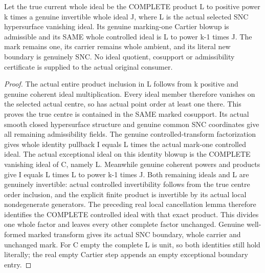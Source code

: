 \begin{lemma}
\label{hir:general-nc-completion-actual-cartier-control}
\leanok
Let the true current whole ideal be the COMPLETE product L to positive power
k times a genuine invertible whole ideal J, where L is the actual selected
SNC hypersurface vanishing ideal. Its genuine marking-one Cartier blowup is
admissible and its SAME whole controlled ideal is L to power k-1 times J.
The mark remains one, its carrier remains whole ambient, and its literal new
boundary is genuinely SNC. No ideal quotient, cosupport or admissibility
certificate is supplied to the actual original consumer.
\end{lemma}
\begin{proof}
The actual entire product inclusion in L follows from k positive and genuine
coherent ideal multiplication. Every ideal member therefore vanishes on the
selected actual centre, so has actual point order at least one there. This
proves the true centre is contained in the SAME marked cosupport. Its actual
smooth closed hypersurface structure and genuine common SNC coordinates give
all remaining admissibility fields. The genuine controlled-transform
factorization gives whole identity pullback I equals L times the actual
mark-one controlled ideal. The actual exceptional ideal on this identity
blowup is the COMPLETE vanishing ideal of C, namely L. Meanwhile genuine
coherent powers and products give I equals L times L to power k-1 times J.
Both remaining ideals and L are genuinely invertible: actual controlled
invertibility follows from the true centre order inclusion, and the explicit
finite product is invertible by its actual local nondegenerate generators.
The preceding real local cancellation lemma therefore identifies the COMPLETE
controlled ideal with that exact product. This divides one whole factor and
leaves every other complete factor unchanged. Genuine well-formed marked
transform gives its actual SNC boundary, whole carrier and unchanged mark.
For C empty the complete L is unit, so both identities still hold literally;
the real empty Cartier step appends an empty exceptional boundary entry.
\end{proof}

